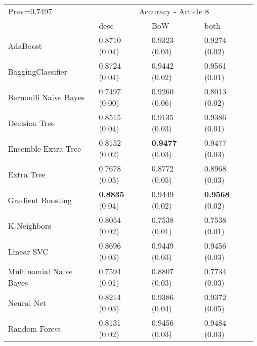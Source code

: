 \begin{tabular}{|l|l|l|l| }
\hline
Prev=0.7497 &  \multicolumn{3}{c|}{Accuracy - Article 8} \\
\cline{2-4} & desc & BoW & both \\ \hline
AdaBoost                & 0.8710 (0.04) & 0.9323 (0.03) & 0.9274 (0.02)\\
BaggingClassifier       & 0.8724 (0.04) & 0.9442 (0.02) & 0.9561 (0.01)\\
Bernoulli Naive Bayes   & 0.7497 (0.00) & 0.9260 (0.06) & 0.8013 (0.02)\\
Decision Tree           & 0.8515 (0.04) & 0.9135 (0.03) & 0.9386 (0.01)\\
Ensemble Extra Tree     & 0.8152 (0.02) & {\bf 0.9477} (0.03) & 0.9477 (0.03)\\
Extra Tree              & 0.7678 (0.05) & 0.8772 (0.05) & 0.8968 (0.03)\\
Gradient Boosting       & {\bf 0.8835} (0.04) & 0.9449 (0.02) & {\bf 0.9568} (0.02)\\
K-Neighbors             & 0.8054 (0.02) & 0.7538 (0.01) & 0.7538 (0.01)\\
Linear SVC              & 0.8696 (0.03) & 0.9449 (0.03) & 0.9456 (0.03)\\
Multinomial Naive Bayes & 0.7594 (0.01) & 0.8807 (0.03) & 0.7734 (0.03)\\
Neural Net              & 0.8214 (0.03) & 0.9386 (0.04) & 0.9372 (0.05)\\
Random Forest           & 0.8131 (0.02) & 0.9456 (0.03) & 0.9484 (0.03)\\
\hline
\end{tabular}